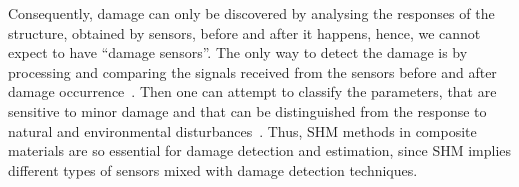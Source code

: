 Consequently, damage can only be discovered by analysing the responses of the structure, 
obtained by sensors, before and after it happens, hence, we cannot expect to have “damage sensors”.
The only way to detect the damage is by processing and comparing the signals received from the sensors before and after damage occurrence~\cite{s18041094}. 
Then one can attempt to classify the parameters, that are sensitive to minor damage and that can be distinguished from the response to natural and environmental disturbances~\cite{s18041094}. 
Thus, SHM  methods in composite materials are so essential for damage detection and estimation, since SHM implies different types of sensors mixed with damage detection techniques. 
